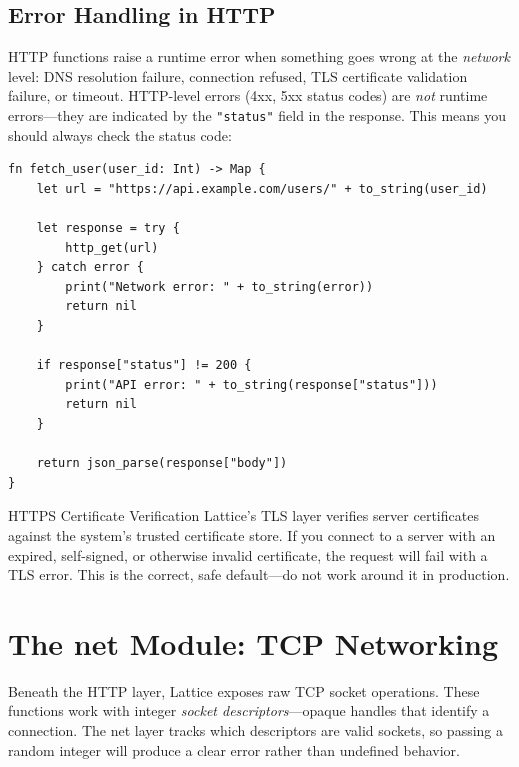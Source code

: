 \subsection{Error Handling in HTTP}\label{sec:http-errors}

HTTP functions raise a runtime error when something goes wrong at the
\emph{network} level: DNS resolution failure, connection refused, TLS
certificate validation failure, or timeout. HTTP-level errors (4xx, 5xx
status codes) are \emph{not} runtime errors---they are indicated by the
\lstinline|"status"| field in the response. This means you should always
check the status code:

\begin{lstlisting}[language=Lattice, caption={Robust HTTP error handling}]
fn fetch_user(user_id: Int) -> Map {
    let url = "https://api.example.com/users/" + to_string(user_id)

    let response = try {
        http_get(url)
    } catch error {
        print("Network error: " + to_string(error))
        return nil
    }

    if response["status"] != 200 {
        print("API error: " + to_string(response["status"]))
        return nil
    }

    return json_parse(response["body"])
}
\end{lstlisting}

\begin{warnbox}{HTTPS Certificate Verification}
Lattice's TLS layer verifies server certificates against the system's
trusted certificate store. If you connect to a server with an expired,
self-signed, or otherwise invalid certificate, the request will fail with a
TLS error. This is the correct, safe default---do not work around it in
production.
\end{warnbox}

\section{The net Module: TCP Networking}\label{sec:net-module}


Beneath the HTTP layer, Lattice exposes raw TCP socket operations. These
functions work with integer \emph{socket descriptors}---opaque handles that
identify a connection. The net layer tracks which descriptors are valid
sockets, so passing a random integer will produce a clear error rather than
undefined behavior.


